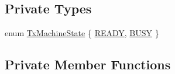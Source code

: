 \subsection*{Private Types}
\begin{DoxyCompactItemize}
\item 
enum \hyperlink{classns3_1_1PointToPointNetDevice_a963e2da767f0ac1b49a74eeb7b63e417}{Tx\+Machine\+State} \{ \hyperlink{classns3_1_1PointToPointNetDevice_a963e2da767f0ac1b49a74eeb7b63e417a462ad9faf8cb8b62bc498f336befcb6a}{R\+E\+A\+DY}, 
\hyperlink{classns3_1_1PointToPointNetDevice_a963e2da767f0ac1b49a74eeb7b63e417ad6dad80bbdc386db39a8ea87e70a0250}{B\+U\+SY}
 \}
\end{DoxyCompactItemize}
\subsection*{Private Member Functions}
